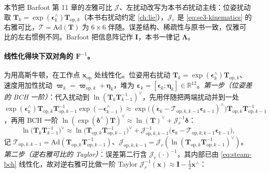 \begin{note}
本节把 Barfoot\cite{barfoot2024state} 第 11 章的\emph{左}雅可比 $\boldsymbol{\mathcal{J}}$、左扰动改写为本书\emph{右}扰动主线：位姿扰动取 $\mathbf{T}_k=\exp(\boldsymbol{\epsilon}_k^\wedge)\mathbf{T}_{\mathrm{op},k}$（本书右扰动约定 \cref{ch:lie}），$\boldsymbol{\mathcal{J}}_r$ 是 \cref{eq:se3-kinematics} 的右雅可比，$\boldsymbol{\mathcal{T}}=\mathrm{Ad}(\mathbf{T})$ 为 $6\times6$ 伴随。误差结构、稀疏性与原书一致，仅雅可比的左右惯例不同。Barfoot 把信息阵记作 $\mathbf{I}$，本书一律记 $\boldsymbol{\Lambda}$。
\end{note}

\paragraph{线性化得块下双对角的 $\mathbf{F}^{-1}$。}
为用高斯牛顿，在工作点 $\mathbf{x}_{\mathrm{op}}$ 处线性化。位姿用右扰动 $\mathbf{T}_k=\exp(\boldsymbol{\epsilon}_k^\wedge)\mathbf{T}_{\mathrm{op},k}$、速度用加性扰动 $\boldsymbol{\varpi}_k=\boldsymbol{\varpi}_{\mathrm{op},k}+\boldsymbol{\eta}_k$，堆为 $\boldsymbol{\varepsilon}_k=[\boldsymbol{\epsilon}_k;\boldsymbol{\eta}_k]\in\mathbb{R}^{12}$。\emph{第一步（位姿差的 BCH 一阶）}：代入扰动到 $\ln(\mathbf{T}_k\mathbf{T}_{k-1}^{-1})^\vee$，先用伴随把两端扰动并到一处 $\exp(\boldsymbol{\epsilon}_k^\wedge)\mathbf{T}_{\mathrm{op},k}\mathbf{T}_{\mathrm{op},k-1}^{-1}\exp(-\boldsymbol{\epsilon}_{k-1}^\wedge)\approx\exp\!\big((\boldsymbol{\epsilon}_k-\boldsymbol{\mathcal{T}}_{\mathrm{op},k,k-1}\boldsymbol{\epsilon}_{k-1})^\wedge\big)\mathbf{T}_{\mathrm{op},k}\mathbf{T}_{\mathrm{op},k-1}^{-1}$，再用 BCH 一阶 $\ln(\exp(\boldsymbol{\delta}^\wedge)\mathbf{T})^\vee\approx\ln(\mathbf{T})^\vee+\boldsymbol{\mathcal{J}}_r^{-1}\boldsymbol{\delta}$：
\begin{equation}
  \ln\!\big(\mathbf{T}_k\mathbf{T}_{k-1}^{-1}\big)^\vee\approx\ln\!\big(\mathbf{T}_{\mathrm{op},k}\mathbf{T}_{\mathrm{op},k-1}^{-1}\big)^\vee+\boldsymbol{\mathcal{J}}_{\mathrm{op},k,k-1}^{-1}\big(\boldsymbol{\epsilon}_k-\boldsymbol{\mathcal{T}}_{\mathrm{op},k,k-1}\boldsymbol{\epsilon}_{k-1}\big),
  \label{eq:steam-bch}
\end{equation}
记 $\boldsymbol{\mathcal{T}}_{\mathrm{op},k,k-1}=\mathrm{Ad}(\mathbf{T}_{\mathrm{op},k}\mathbf{T}_{\mathrm{op},k-1}^{-1})$、$\boldsymbol{\mathcal{J}}_{\mathrm{op},k,k-1}=\boldsymbol{\mathcal{J}}_r(\ln(\mathbf{T}_{\mathrm{op},k}\mathbf{T}_{\mathrm{op},k-1}^{-1})^\vee)$。\emph{第二步（逆右雅可比的 Taylor）}：误差第二行含 $\boldsymbol{\mathcal{J}}_r(\cdot)^{-1}$，其内部已由 \cref{eq:steam-bch} 线性化，故对逆右雅可比做一阶 Taylor $\boldsymbol{\mathcal{J}}_r^{-1}(\mathbf{x})\approx\mathbf{I}-\tfrac12\mathbf{x}^\curlywedge$：
